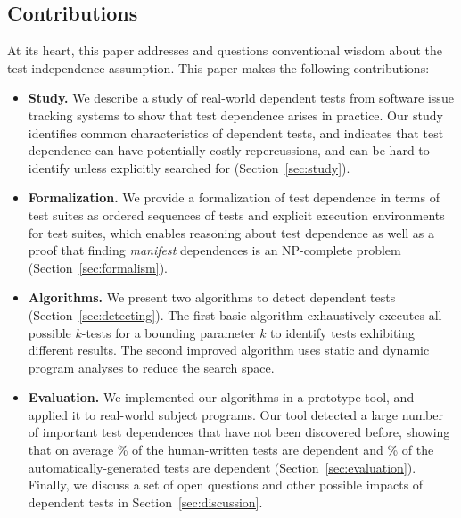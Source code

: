 
\subsection{Contributions}

At its heart, this paper addresses and questions
conventional wisdom about the test independence assumption. 
This paper makes the following contributions:

\begin{itemize}

  \item \textbf{Study.} We describe a study of \dtnum real-world
  dependent tests from \repnum software issue tracking
  systems to show that test dependence
  arises in practice. Our study identifies common
  characteristics of dependent tests, and
  indicates that test dependence can have
  potentially costly repercussions, and can be hard to identify unless
  explicitly searched for (Section~\ref{sec:study}).

\item \textbf{Formalization.} We provide a formalization of test dependence
  in terms of test suites as ordered sequences of tests and explicit execution
  environments for test suites, which enables reasoning about test dependence
  as well as a proof that finding \emph{manifest} dependences is an NP-complete
  problem (Section~\ref{sec:formalism}).

  \item \textbf{Algorithms.} We present two algorithms
  to detect dependent tests (Section~\ref{sec:detecting}). The first
  basic algorithm exhaustively executes all possible $k$-tests for
  a bounding parameter $k$ to identify tests exhibiting different results.
  The second improved algorithm uses static and dynamic program analyses
  to reduce the search space. 

  \item \textbf{Evaluation.} We implemented our algorithms in a prototype
  tool, and applied it to  real-world subject programs. Our
  tool detected a large number of important test dependences that have not
  been discovered before, showing that on average \% of the human-written
  tests are dependent and \% of the automatically-generated tests are dependent
   (Section~\ref{sec:evaluation}).
  Finally, we discuss a set of open questions and other possible impacts of dependent
  tests in Section~\ref{sec:discussion}.
\end{itemize}


